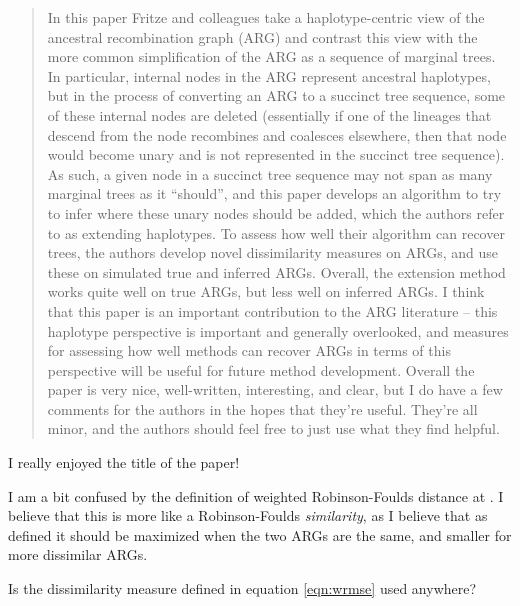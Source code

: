 \begin{quote}
In this paper Fritze and colleagues take a haplotype-centric view of the ancestral recombination graph (ARG) and contrast this view with the more common simplification of the ARG as a sequence of marginal trees. In particular, internal nodes in the ARG represent ancestral haplotypes, but in the process of converting an ARG to a succinct tree sequence, some of these internal nodes are deleted (essentially if one of the lineages that descend from the node recombines and coalesces elsewhere, then that node would become unary and is not represented in the succinct tree sequence). As such, a given node in a succinct tree sequence may not span as many marginal trees as it ``should'', and this paper develops an algorithm to try to infer where these unary nodes should be added, which the authors refer to as extending haplotypes. To assess how well their algorithm can recover trees, the authors develop novel dissimilarity measures on ARGs, and use these on simulated true and inferred ARGs. Overall, the extension method works quite well on true ARGs, but less well on inferred ARGs. I think that this paper is an important contribution to the ARG literature -- this haplotype perspective is important and generally overlooked, and measures for assessing how well methods can recover ARGs in terms of this perspective will be useful for future method development. Overall the paper is very nice, well-written, interesting, and clear, but I do have a few comments for the authors in the hopes that they're useful. They're all minor, and the authors should feel free to just use what they find helpful.
\end{quote}

\begin{point}{}
 I really enjoyed the title of the paper!
\end{point}


\begin{point}{\revref}
 I am a bit confused by the definition of weighted Robinson-Foulds distance at \revref.%
I believe that this is more like a Robinson-Foulds \emph{similarity}, as I believe that as defined it should be maximized when the two ARGs are the same, and smaller for more dissimilar ARGs.
\end{point}

\reply{
}

\begin{point}{}
 Is the dissimilarity measure defined in equation \eqref{eqn:wrmse} used anywhere?
\end{point}


